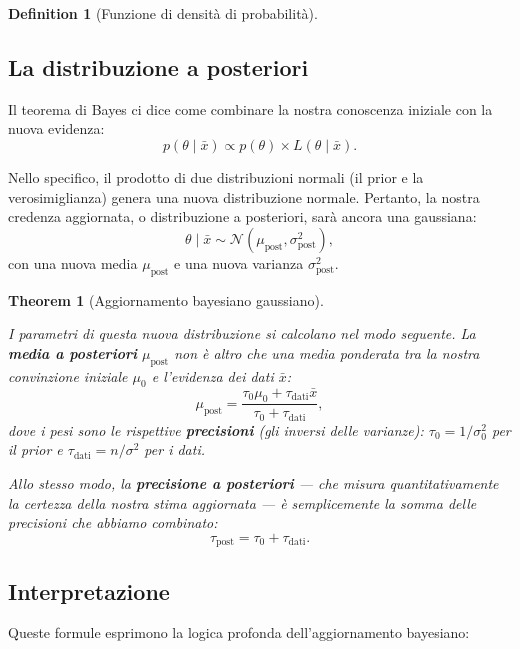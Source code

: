 \documentclass[
  letterpaper,
  DIV=11,
  numbers=noendperiod,
  oneside]{scrreprt}
\theoremstyle{definition}
\theoremstyle{plain}
\newtheorem{theorem}{Theorem}[chapter]
\theoremstyle{definition}
\newtheorem{definition}{Definition}[chapter]
\theoremstyle{remark}
\begin{document}
\begin{definition}[Funzione di densità di
probabilità]
\subsection{La distribuzione a
posteriori}\label{la-distribuzione-a-posteriori}

Il teorema di Bayes ci dice come combinare la nostra conoscenza iniziale
con la nuova evidenza: \[
p(\theta \mid \bar{x}) \propto p(\theta) \times L(\theta \mid \bar{x}).
\]

Nello specifico, il prodotto di due distribuzioni normali (il prior e la
verosimiglianza) genera una nuova distribuzione normale. Pertanto, la
nostra credenza aggiornata, o distribuzione a posteriori, sarà ancora
una gaussiana: \[
\theta \mid \bar{x} \sim \mathcal{N}(\mu_{\text{post}}, \sigma_{\text{post}}^2),
\] con una nuova media \(\mu_{\text{post}}\) e una nuova varianza
\(\sigma_{\text{post}}^2\).

\begin{theorem}[Aggiornamento bayesiano
gaussiano]\protect\hypertarget{thm-posterior-gaussian}{}\label{thm-posterior-gaussian}

I parametri di questa nuova distribuzione si calcolano nel modo
seguente. La \textbf{media a posteriori} \(\mu_{\text{post}}\) non è
altro che una media ponderata tra la nostra convinzione iniziale
\(\mu_0\) e l'evidenza dei dati \(\bar{x}\): \[
\mu_{\text{post}} = \frac{\tau_0 \mu_0 + \tau_{\text{dati}} \bar{x}}{\tau_0 + \tau_{\text{dati}}},
\] dove i pesi sono le rispettive \textbf{precisioni} (gli inversi delle
varianze): \(\tau_0 = 1/\sigma_0^2\) per il prior e
\(\tau_{\text{dati}} = n/\sigma^2\) per i dati.

Allo stesso modo, la \textbf{precisione a posteriori} --- che misura
quantitativamente la certezza della nostra stima aggiornata --- è
semplicemente la somma delle precisioni che abbiamo combinato: \[
\tau_{\text{post}} = \tau_0 + \tau_{\text{dati}}.
\]

\end{theorem}

\subsection{Interpretazione}\label{interpretazione-1}

Queste formule esprimono la logica profonda dell'aggiornamento
bayesiano:


\end{definition}
\end{document}
